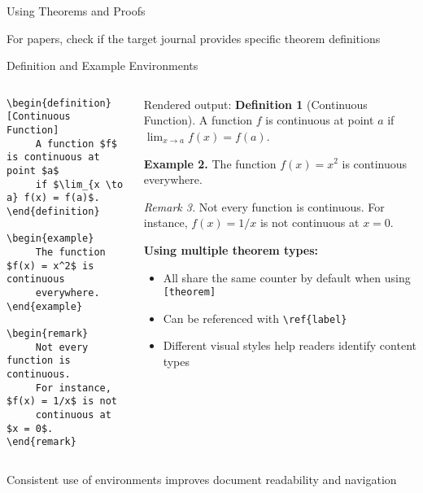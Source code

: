 \begin{frame}[fragile]{Using Theorems and Proofs}
     \begin{tip}
          For papers, check if the target journal provides specific theorem definitions
     \end{tip}
\end{frame}

\begin{frame}[fragile]{Definition and Example Environments}
     \begin{columns}
          \begin{column}{0.5\textwidth}
       \begin{lstlisting}[basicstyle=\footnotesize\ttfamily]
\begin{definition}[Continuous Function]
     A function $f$ is continuous at point $a$
     if $\lim_{x \to a} f(x) = f(a)$.
\end{definition}

\begin{example}
     The function $f(x) = x^2$ is continuous
     everywhere.
\end{example}

\begin{remark}
     Not every function is continuous.
     For instance, $f(x) = 1/x$ is not 
     continuous at $x = 0$.
\end{remark}
               \end{lstlisting}
          \end{column}
          
          \begin{column}{0.5\textwidth}
               \begin{block}{Rendered output:}
                    \textbf{Definition 1} (Continuous Function). A function $f$ is continuous at point $a$ if $\lim_{x \to a} f(x) = f(a)$.
                    
                    \textbf{Example 2.} The function $f(x) = x^2$ is continuous everywhere.
                    
                    \textit{Remark 3.} Not every function is continuous. For instance, $f(x) = 1/x$ is not continuous at $x = 0$.
               \end{block}
               
               \textbf{Using multiple theorem types:}
               \begin{itemize}
                    \item All share the same counter by default when using \texttt{[theorem]}
                    \item Can be referenced with \texttt{\textbackslash ref\{label\}}
                    \item Different visual styles help readers identify content types
               \end{itemize}
          \end{column}
     \end{columns}
     
     \begin{tip}
          Consistent use of environments improves document readability and navigation
     \end{tip}
\end{frame}

